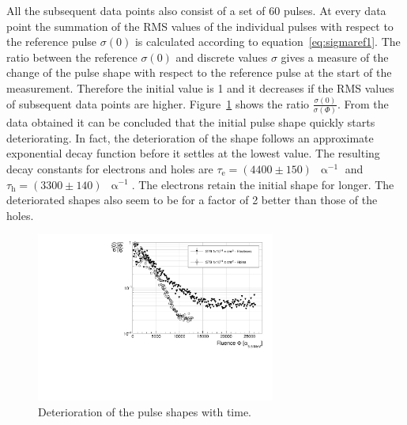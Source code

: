All the subsequent data points also consist of a set of 60 pulses. At every data point the summation of the RMS values of the individual pulses with respect to the reference pulse $\sigma (0)$ is calculated according to equation~\ref{eq:sigmaref1}. The ratio between the reference $\sigma (0)$ and discrete values $\sigma$ gives a measure of the change of the pulse shape with respect to the reference pulse at the start of the measurement. Therefore the initial value is 1 and it decreases if the RMS values of subsequent data points are higher.
Figure~\ref{fig:longtermc2corr} shows the ratio $\frac{\sigma (0) }{\sigma(\Phi)}$. From the data obtained it can be concluded that the initial pulse shape quickly starts deteriorating. In fact, the deterioration of the shape follows an approximate exponential decay function before it settles at the lowest value. The resulting decay constants for electrons and holes are $\tau_{\mathrm{e}}=(4400\pm150)$~$\upalpha^{-1}$ and $\tau_{\mathrm{h}}=(3300\pm140)$~$\upalpha^{-1}$. The electrons retain the initial shape for longer. The deteriorated shapes also seem to be for a factor of 2 better than those of the holes. 

\begin{figure}[!t]
\begin{center}
\includegraphics[width=0.7\textwidth]{03_measurement_results/scripts/plots/plotLifetime/corrlifetime}
\caption{Deterioration of the pulse shapes with time.}
\label{fig:longtermc2corr}
\end{center}
\end{figure}



